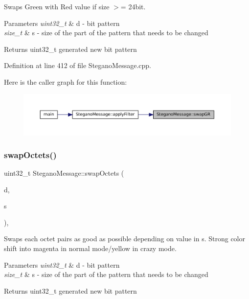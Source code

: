 Swaps Green with Red value if size $>$= 24bit. 


\begin{DoxyParams}{Parameters}
{\em uint32\+\_\+t} & d -\/ bit pattern \\
\hline
{\em size\+\_\+t} & s -\/ size of the part of the pattern that needs to be changed \\
\hline
\end{DoxyParams}
\begin{DoxyReturn}{Returns}
uint32\+\_\+t generated new bit pattern 
\end{DoxyReturn}


Definition at line 412 of file Stegano\+Message.\+cpp.

Here is the caller graph for this function\+:\nopagebreak
\begin{figure}[H]
\begin{center}
\leavevmode
\includegraphics[width=350pt]{classSteganoMessage_a7e29a46073f2ef9c6e44bb1d46ad534f_icgraph}
\end{center}
\end{figure}
\mbox{\label{classSteganoMessage_a4751ad396485b5859b84970ddd20290d}} 
\subsubsection{\texorpdfstring{swapOctets()}{swapOctets()}}
{\footnotesize\ttfamily uint32\+\_\+t Stegano\+Message\+::swap\+Octets (\begin{DoxyParamCaption}\item[{uint32\+\_\+t}]{d,  }\item[{size\+\_\+t}]{s }\end{DoxyParamCaption})\hspace{0.3cm}{\ttfamily [static]}, {\ttfamily [private]}}



Swaps each octet pairs as good as possible depending on value in s. Strong color shift into magenta in normal mode/yellow in crazy mode. 


\begin{DoxyParams}{Parameters}
{\em uint32\+\_\+t} & d -\/ bit pattern \\
\hline
{\em size\+\_\+t} & s -\/ size of the part of the pattern that needs to be changed \\
\hline
\end{DoxyParams}
\begin{DoxyReturn}{Returns}
uint32\+\_\+t generated new bit pattern 
\end{DoxyReturn}


